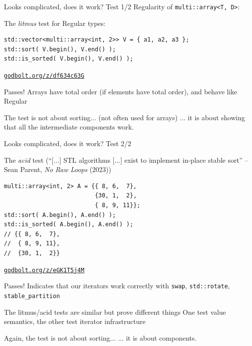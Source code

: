 \begin{frame}[fragile]{Looks complicated, does it work? Test 1/2}
Regularity of \lstinline|multi::array<T, D>|:

The \textit{litmus} test for Regular types:
\begin{lstlisting}
std::vector<multi::array<int, 2>> V = { a1, a2, a3 };
std::sort( V.begin(), V.end() );
std::is_sorted( V.begin(), V.end() );
\end{lstlisting}
{\raggedleft\href{https://godbolt.org/z/df634c63G}{\texttt{godbolt.org/z/df634c63G}}\par}

{
\begin{alertblock}{Passes!}
  Arrays have total order (if elements have total order),
  and behave like Regular
\end{alertblock}
}

\begin{alertblock}{The test is not about sorting... (not often used for arrays)}
  ... it is about showing that all the intermediate components work.
\end{alertblock}

\end{frame}

\begin{frame}[fragile]{Looks complicated, does it work? Test 2/2}

The \textit{acid} test (``[...] STL algorithms [...] exist to implement in-place stable sort'' -- Sean Parent, \emph{No Raw Loops} (2023))

\begin{lstlisting}
multi::array<int, 2> A = {{ 8, 6,  7},
                          {30, 1,  2},
                          { 8, 9, 11}};
std::sort( A.begin(), A.end() );
std::is_sorted( A.begin(), A.end() );
// {{ 8, 6,  7},
//  { 8, 9, 11},
//  {30, 1,  2}}
\end{lstlisting}
{\raggedleft\href{https://godbolt.org/z/eGK1T5j4M}{\texttt{godbolt.org/z/eGK1T5j4M}}\par}

{
\begin{alertblock}{Passes!}
  Indicates that our iterators work correctly with \lstinline|swap|, \lstinline|std::rotate|, \lstinline|stable_partition|
\end{alertblock}
}

\begin{alertblock}{The litmus/acid tests are similar but prove different things}
  One test value semantics, the other test iterator infrastructure
\end{alertblock}

\begin{alertblock}{Again, the test is not about sorting...}
  ... it is about components.
\end{alertblock}

\end{frame}

